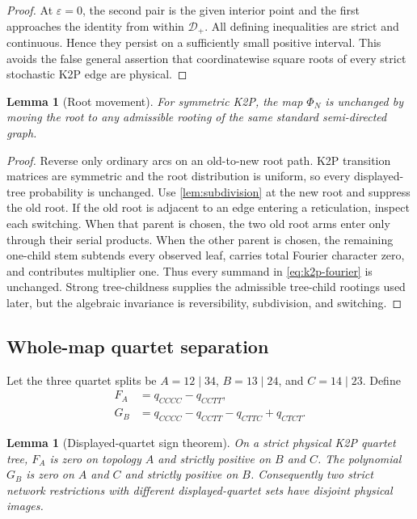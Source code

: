 \documentclass[11pt]{article}
\newtheorem{lemma}[theorem]{Lemma}
\theoremstyle{remark}
\newcommand{\Dplus}{\mathcal D_+}
\newcommand{\1}{\mathbf 1}
\begin{document}
\begin{proof}
At \(\varepsilon=0\), the second pair is the given interior point and the
first approaches the identity from within \(\Dplus\).  All defining
inequalities are strict and continuous.  Hence they persist on a sufficiently
small positive interval.  This avoids the false general assertion that
coordinatewise square roots of every strict stochastic K2P edge are physical.
\end{proof}

\begin{lemma}[Root movement]\label{lem:root-movement}
For symmetric K2P, the map \(\Phi_N\) is unchanged by moving the root to any
admissible rooting of the same standard semi-directed graph.
\end{lemma}

\begin{proof}
Reverse only ordinary arcs on an old-to-new root path.  K2P transition
matrices are symmetric and the root distribution is uniform, so every
displayed-tree probability is unchanged.  Use \cref{lem:subdivision} at the
new root and suppress the old root.  If the old root is adjacent to an edge
entering a reticulation, inspect each switching.  When that parent is chosen,
the two old root arms enter only through their serial products.  When the
other parent is chosen, the remaining one-child stem subtends every observed
leaf, carries total Fourier character zero, and contributes multiplier one.
Thus every summand in \eqref{eq:k2p-fourier} is unchanged.  Strong
tree-childness supplies the admissible tree-child rootings used later, but
the algebraic invariance is reversibility, subdivision, and switching.
\end{proof}

\subsection{Whole-map quartet separation}

Let the three quartet splits be
\(A=12\mid34\), \(B=13\mid24\), and \(C=14\mid23\).  Define
\begin{align}
 F_A&=q_{CCCC}-q_{CCTT},\label{eq:quartet-F}\\
 G_B&=q_{CCCC}-q_{CCTT}-q_{CTTC}+q_{CTCT}.
 \label{eq:quartet-G}
\end{align}

\begin{lemma}[Displayed-quartet sign theorem]\label{lem:quartet}
On a strict physical K2P quartet tree, \(F_A\) is zero on topology \(A\)
and strictly positive on \(B\) and \(C\).  The polynomial \(G_B\) is zero
on \(A\) and \(C\) and strictly positive on \(B\).  Consequently two strict
network restrictions with different displayed-quartet sets have disjoint
physical images.
\end{lemma}
\end{document}
